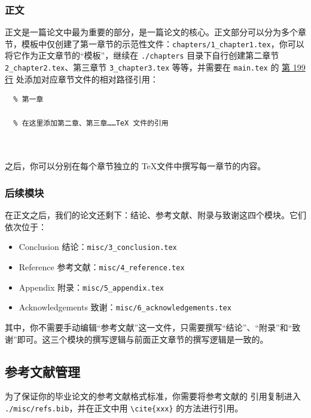 \subsubsection{正文}

正文是一篇论文中最为重要的部分，是一篇论文的核心。正文部分可以分为多个章节，模板中仅创建了第一章节的示范性文件：\texttt{chapters/1\_chapter1.tex}，你可以将它作为正文章节的“模板”，继续在 \texttt{./chapters} 目录下自行创建第二章节 \texttt{2\_chapter2.tex}、第三章节 \texttt{3\_chapter3.tex} 等等，并需要在 \texttt{main.tex} 的 \href{https://github.com/spencerwooo/BIThesis/blob/master/graduation-thesis/main.tex#L199-L203}{第 199 行} 处添加对应章节文件的相对路径引用：

\begin{verbatim}
  % 第一章
  
  % 在这里添加第二章、第三章……TeX 文件的引用
  
  
\end{verbatim}

之后，你可以分别在每个章节独立的 \TeX 文件中撰写每一章节的内容。

\subsubsection{后续模块}

在正文之后，我们的论文还剩下：结论、参考文献、附录与致谢这四个模块。它们依次位于：

\begin{itemize}
  \item Conclusion 结论：\texttt{misc/3\_conclusion.tex}
  \item Reference 参考文献：\texttt{misc/4\_reference.tex}
  \item Appendix 附录：\texttt{misc/5\_appendix.tex}
  \item Acknowledgements 致谢：\texttt{misc/6\_acknowledgements.tex}
\end{itemize}

其中，你不需要手动编辑“参考文献”这一文件，只需要撰写“结论”、“附录”和“致谢”即可。这三个模块的撰写逻辑与前面正文章节的撰写逻辑是一致的。

\subsection{参考文献管理}

为了保证你的毕业论文的参考文献格式标准，你需要将参考文献的  引用复制进入 \texttt{./misc/refs.bib}，并在正文中用 \verb|\cite{xxx}| 的方法进行引用。

